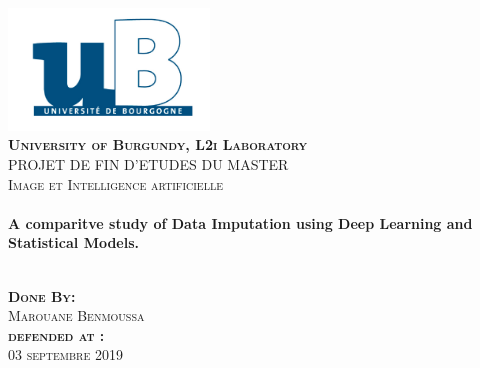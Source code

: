 \documentclass[11pt]{report}           %
\begin{document}
\begin{titlepage}
\begin{center}

\includegraphics[width=0.4\textwidth]{img/logoUniv}~\\[1cm]

\textsc{\LARGE \bfseries University of Burgundy, L2i Laboratory }\\[1.1cm]


\textsc{\Large PROJET DE FIN D’ETUDES DU MASTER}\\[0.3cm]

\textsc{\Large Image et Intelligence artificielle }\\[0.2cm]

\HRule \\[0.1cm]

{\huge \bfseries A comparitve study of Data Imputation using Deep Learning and Statistical Models.\\[0.6cm] }

\HRule \\[0.1cm]

\textsc{\bfseries Done By:}\\%
\textsc{\large Marouane Benmoussa}\\[0.2cm]

\textsc{\Large \bfseries defended at  :}\\%
\textsc{\large 03 septembre 2019}\\[0.1cm]

%


\end{center}
\end{titlepage}
\end{document}
